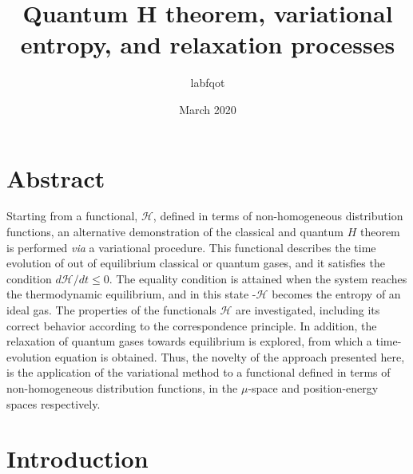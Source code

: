 \documentclass{article}
\title{Quantum H theorem, variational entropy, and relaxation processes}
\author{labfqot}
\date{March 2020}
\begin{document}
\maketitle

\section*{Abstract}
Starting from a functional, $\mathcal{H}$, defined in terms of non-homogeneous distribution functions, an alternative demonstration of the classical and quantum $H$ theorem is performed \textit{via} a variational procedure. This functional describes the time evolution of out of equilibrium classical or quantum gases, and it satisfies the condition $d\mathcal{H}/dt\leq0$. The equality condition is attained when the system reaches the thermodynamic equilibrium, and in this state -$\mathcal{H}$ becomes the entropy of an ideal  gas. The properties of the functionals $\mathcal{H}$ are investigated, including its correct behavior according to the correspondence principle. In addition, the relaxation of quantum gases towards equilibrium is explored, from which a time-evolution equation is obtained. Thus, the novelty of the approach presented here, is the application of the variational method to a functional defined in terms of non-homogeneous distribution functions, in the $\mu$-space and position-energy spaces respectively.







\section{Introduction}
\end{document}
